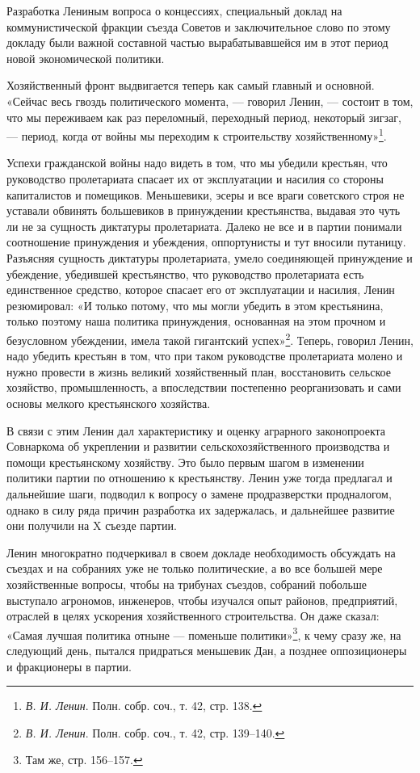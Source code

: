 \documentclass[12pt, a4paper, openany]{book}
\begin{document}
Разработка Лениным вопроса о концессиях, специальный доклад на коммунистической фракции съезда Советов и заключительное слово по этому докладу были важной составной частью вырабатывавшейся им в этот период новой экономической политики.

Хозяйственный фронт выдвигается теперь как самый главный и основной. «Сейчас весь гвоздь политического момента, — говорил Ленин, — состоит в том, что мы переживаем как раз переломный, переходный период, некоторый зигзаг, — период, когда от войны мы переходим к строительству хозяйственному»\footnote{\textit{В. И. Ленин}. Полн. собр. соч., т. 42, стр. 138.}.

Успехи гражданской войны надо видеть в том, что мы убедили крестьян, что руководство пролетариата спасает их от эксплуатации и насилия со стороны капиталистов и помещиков. Меньшевики, эсеры и все враги советского строя не уставали обвинять большевиков в принуждении крестьянства, выдавая это чуть ли не за сущность диктатуры пролетариата. Далеко не все и в партии понимали соотношение принуждения и убеждения, оппортунисты и тут вносили путаницу. Разъясняя сущность диктатуры пролетариата, умело соединяющей принуждение и убеждение, убедившей крестьянство, что руководство пролетариата есть единственное средство, которое спасает его от эксплуатации и насилия, Ленин резюмировал: «И только потому, что мы могли убедить в этом крестьянина, только поэтому наша политика принуждения, основанная на этом прочном и безусловном убеждении, имела такой гигантский успех»\footnote{\textit{В. И. Ленин}. Полн. собр. соч., т. 42, стр. 139–140.}. Теперь, говорил Ленин, надо убедить крестьян в том, что при таком руководстве пролетариата молено и нужно провести в жизнь великий хозяйственный план, восстановить сельское хозяйство, промышленность, а впоследствии постепенно реорганизовать и сами основы мелкого крестьянского хозяйства.

В связи с этим Ленин дал характеристику и оценку аграрного законопроекта Совнаркома об укреплении и развитии сельскохозяйственного производства и помощи крестьянскому хозяйству. Это было первым шагом в изменении политики партии по отношению к крестьянству. Ленин уже тогда предлагал и дальнейшие шаги, подводил к вопросу о замене продразверстки продналогом, однако в силу ряда причин разработка их задержалась, и дальнейшее развитие они получили на X съезде партии.

Ленин многократно подчеркивал в своем докладе необходимость обсуждать на съездах и на собраниях уже не только политические, а во все большей мере хозяйственные вопросы, чтобы на трибунах съездов, собраний побольше выступало агрономов, инженеров, чтобы изучался опыт районов, предприятий, отраслей в целях ускорения хозяйственного строительства. Он даже сказал: «Самая лучшая политика отныне — поменьше политики»\footnote{Там же, стр. 156–157.}, к чему сразу же, на следующий день, пытался придраться меньшевик Дан, а позднее оппозиционеры и фракционеры в партии.
\end{document}
